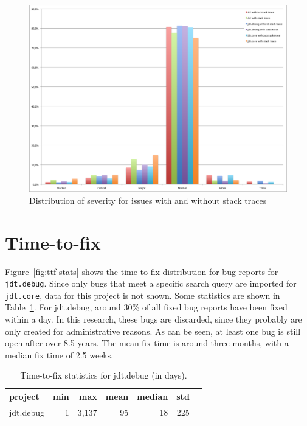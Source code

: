 \begin{figure}[!ht]
	\centering
		\includegraphics[width=1\textwidth]{img/severity.png}
	\caption{Distribution of severity for issues with and without stack traces}
	\label{fig:severity}
\end{figure}

\section{Time-to-fix} %
\label{sec:time_to_fix}
Figure~\ref{fig:ttf-stats} shows the time-to-fix distribution for bug reports for \texttt{jdt.debug}. Since only bugs that meet a specific search query are imported for \texttt{jdt.core}, data for this project is not shown. Some statistics are shown in Table~\ref{tab:ttf-stats}. For jdt.debug, around 30\% of all fixed bug reports have been fixed within a day. In this research, these bugs are discarded, since they probably are only created for administrative reasons. As can be seen, at least one bug is still open after over 8.5 years. The mean fix time is around three months, with a median fix time of 2.5 weeks. 

\begin{table}[!ht]\footnotesize
	\centering
	\begin{tabular}{lrrrrrr}
		\toprule
		project & min & max & mean & median & std \\
		\midrule
		jdt.debug & 1 & 3,137 & 95 & 18 & 225 \\
		\bottomrule
	\end{tabular} 
	\caption{Time-to-fix statistics for jdt.debug (in days).}
	\label{tab:ttf-stats}
\end{table}

